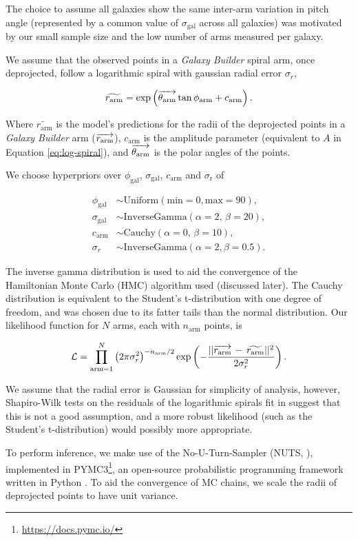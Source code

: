 The choice to assume all galaxies show the same inter-arm variation in pitch angle (represented by a common value of $\sigma_\mathrm{gal}$ across all galaxies) was motivated by our small sample size and the low number of arms measured per galaxy.

We assume that the observed points in a \textit{Galaxy Builder} spiral arm, once deprojected, follow a logarithmic spiral with gaussian radial error $\sigma_r$,

\begin{equation}
\widetilde{r_\mathrm{arm}} = \exp\left(\overrightarrow{\theta_\mathrm{arm}}\tan\phi_\mathrm{arm} + c_\mathrm{arm}\right).
\end{equation}

Where $\widetilde{r_\mathrm{arm}}$ is the model's predictions for the radii of the deprojected points in a \textit{Galaxy Builder} arm ($\overrightarrow{r_\mathrm{arm}}$), $c_\mathrm{arm}$ is the amplitude parameter (equivalent to $A$ in Equation \ref{eq:log-spiral}), and $\overrightarrow{\theta_\mathrm{arm}}$ is the polar angles of the points.

We choose hyperpriors over $\phi_\mathrm{gal}$, $\sigma_\mathrm{gal}$, $c_\mathrm{arm}$ and $\sigma_\mathrm{r}$ of

\begin{align}
  \phi_\mathrm{gal} &\sim \mathrm{Uniform}(\mathrm{min}=0, \mathrm{max}=90),\\
  \sigma_\mathrm{gal} &\sim \mathrm{InverseGamma}(\alpha=2,\,\beta=20),\\
  c_\mathrm{arm} &\sim \mathrm{Cauchy}(\alpha=0,\,\beta=10),\\
  \sigma_r &\sim \mathrm{InverseGamma}(\alpha=2, \beta=0.5).
\end{align}

The inverse gamma distribution is used to aid the convergence of the Hamiltonian Monte Carlo (HMC) algorithm used (discussed later). The Cauchy distribution is equivalent to the Student's t-distribution with one degree of freedom, and was chosen due to its fatter tails than the normal distribution. Our likelihood function for $N$ arms, each with $n_\mathrm{arm}$ points, is

\begin{equation}
  \mathcal{L} = \prod_{\mathrm{arm}=1}^{N}\left(2\pi\sigma_r^2\right)^{-n_\mathrm{arm}/2}
  \exp\left(-\frac{||\overrightarrow{r_\mathrm{arm}}\,-\,\widetilde{r_\mathrm{arm}}||^2}{2\sigma_r^2}\right).
\end{equation}

We assume that the radial error is Gaussian for simplicity of analysis, however, Shapiro-Wilk tests on the residuals of the logarithmic spirals fit in \citet{2020arXiv200610450L} suggest that this is not a good assumption, and a more robust likelihood (such as the Student's t-distribution) would possibly more appropriate.

To perform inference, we make use of the No-U-Turn-Sampler (NUTS, \citealt{2011arXiv1111.4246H}), implemented in PYMC3\footnote{\url{https://docs.pymc.io/}}, an open-source probabilistic programming framework written in Python \citep{pymc3_paper}. To aid the convergence of MC chains, we scale the radii of deprojected points to have unit variance.
